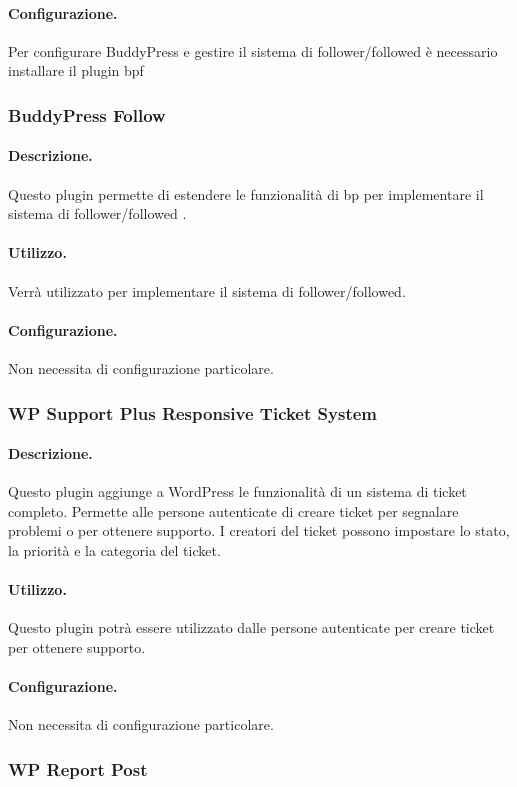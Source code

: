 \paragraph{Configurazione.}
Per configurare BuddyPress e gestire il sistema di follower/followed è necessario installare il plugin \gls{bpf}

\subsubsection{BuddyPress Follow}
\paragraph{Descrizione.}
Questo plugin permette di estendere le funzionalità di \gls{bp} per implementare il sistema di follower/followed .
\paragraph{Utilizzo.} Verrà utilizzato per implementare il sistema di follower/followed.
\paragraph{Configurazione.} Non necessita di configurazione particolare.

\subsubsection{WP Support Plus Responsive Ticket System}
\paragraph{Descrizione.} Questo plugin aggiunge a WordPress le funzionalità di un sistema di ticket completo. Permette alle persone autenticate di creare ticket per segnalare problemi o per ottenere supporto. I creatori del ticket possono impostare lo stato, la priorità e la categoria del ticket.
\paragraph{Utilizzo.} Questo plugin potrà essere utilizzato dalle persone autenticate per creare ticket per ottenere supporto.
\paragraph{Configurazione.} Non necessita di configurazione particolare.

\subsubsection{WP Report Post}

